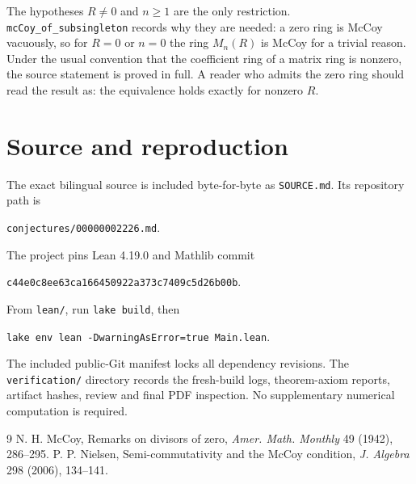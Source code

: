 \documentclass[11pt]{article}
\begin{document}
The hypotheses $R\ne0$ and $n\ge1$ are the only restriction.
\texttt{mcCoy\_of\_subsingleton} records why they are needed: a zero
ring is McCoy vacuously, so for $R=0$ or $n=0$ the ring $M_n(R)$ is
McCoy for a trivial reason. Under the usual convention that the
coefficient ring of a matrix ring is nonzero, the source statement is
proved in full. A reader who admits the zero ring should read the
result as: the equivalence holds exactly for nonzero $R$.

\section*{Source and reproduction}
The exact bilingual source is included byte-for-byte as
\texttt{SOURCE.md}. Its repository path is
\begin{center}\small\texttt{conjectures/00000002226.md}.\end{center}
The project pins Lean 4.19.0 and Mathlib commit
\begin{center}\small\texttt{c44e0c8ee63ca166450922a373c7409c5d26b00b}.\end{center}
From \texttt{lean/}, run \texttt{lake build}, then
\begin{center}\small\texttt{lake env lean -DwarningAsError=true Main.lean}.\end{center}
The included public-Git manifest locks all dependency revisions. The
\texttt{verification/} directory records the fresh-build logs,
theorem-axiom reports, artifact hashes, review and final PDF
inspection. No supplementary numerical computation is required.

\begin{thebibliography}{9}
 N. H. McCoy, Remarks on divisors of zero,
\emph{Amer. Math. Monthly} 49 (1942), 286--295.
 P. P. Nielsen, Semi-commutativity and the McCoy
condition, \emph{J. Algebra} 298 (2006), 134--141.
\end{thebibliography}
\end{document}
